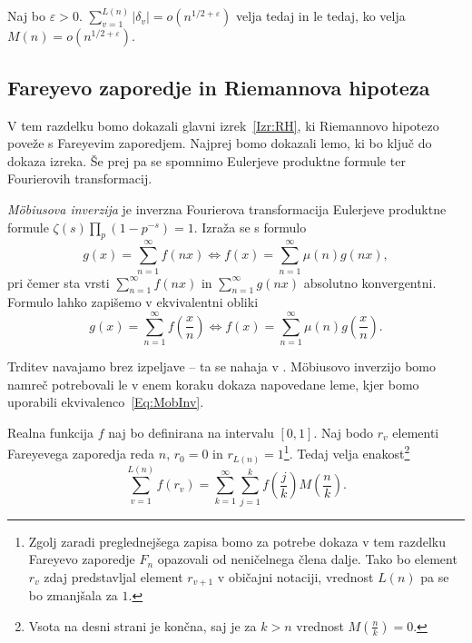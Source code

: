 \documentclass[mat1]{fmfdelo}
\begin{document}
\begin{izrek}
\label{Izr:RH}
Naj bo $\varepsilon > 0$. \( \sum_{v=1}^{L(n)}|\delta_{v}| = o(n^{1/2+\varepsilon}) \) velja tedaj in le tedaj, ko velja \( M(n) = o(n^{1/2+\varepsilon}). \)
\end{izrek}

\subsection{Fareyevo zaporedje in Riemannova hipoteza}

V tem razdelku bomo dokazali glavni izrek~\ref{Izr:RH}, ki Riemannovo hipotezo poveže s Fareyevim zaporedjem. Najprej bomo dokazali lemo, ki bo ključ do dokaza izreka. Še prej pa se spomnimo Eulerjeve produktne formule ter Fourierovih transformacij.

\begin{trditev}
\emph{M\"obiusova inverzija} je inverzna Fourierova transformacija Eulerjeve produktne formule \( \zeta(s) \prod_{p} (1-p^{-s}) = 1. \) 
Izraža se s formulo
\begin{equation}
g(x) = \sum_{n=1}^{\infty} f(nx) \Longleftrightarrow f(x) = \sum_{n=1}^{\infty} \mu(n) g(nx),
\end{equation}
pri čemer sta vrsti $\sum_{n=1}^{\infty} f(nx)$ in $\sum_{n=1}^{\infty} g(nx)$ absolutno konvergentni.
Formulo lahko zapišemo v ekvivalentni obliki
\begin{equation}
\label{Eq:MobInv}
g(x) = \sum_{n=1}^{\infty} f \left(\frac{x}{n} \right) \Longleftrightarrow f(x) = \sum_{n=1}^{\infty} \mu(n) g \left(\frac{x}{n} \right).
\end{equation}
%
\end{trditev}

Trditev navajamo brez izpeljave -- ta se nahaja v \cite[poglavje 10.9]{zetafunction}. M\"obiusovo inverzijo bomo namreč potrebovali le v enem koraku dokaza napovedane leme, kjer bomo uporabili ekvivalenco~\eqref{Eq:MobInv}.

\begin{lema}
\label{Lema:RiemFar}
Realna funkcija $f$ naj bo definirana na intervalu $[0,1]$. Naj bodo $r_{v}$ elementi Fareyevega zaporedja reda $n$, $r_{0}=0$ in $r_{L(n)}=1$\footnote{Zgolj zaradi preglednejšega zapisa bomo za potrebe dokaza v tem razdelku Fareyevo zaporedje $F_{n}$ opazovali od neničelnega člena dalje. Tako bo element $r_{v}$ zdaj predstavljal element $r_{v+1}$ v običajni notaciji, vrednost $L(n)$ pa se bo zmanjšala za $1$.}. Tedaj velja enakost\footnote{Vsota na desni strani je končna, saj je za $k>n$ vrednost $M(\frac{n}{k})=0$.}
\begin{equation}
\label{Eq:RiemFar1}
	\sum_{v=1}^{L(n)} f(r_v) = \sum_{k=1}^{\infty} \sum_{j=1}^{k} f \left(\frac{j}{k} \right) M \left(\frac{n}{k} \right).
\end{equation}
\end{lema}
\end{document}
